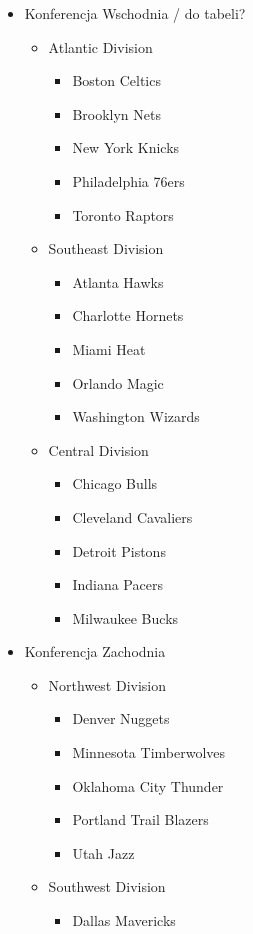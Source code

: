 \documentclass[inzynierska]{pwr_wmat_praca_dyplomowa}
\theoremstyle{plain}
\numberwithin{theorem}{chapter}
\theoremstyle{definition}
\numberwithin{theorem}{chapter}
\begin{document}
\begin{itemize}
	\item Konferencja Wschodnia   / do tabeli?
	\begin{itemize}
		\item Atlantic Division
		\begin{itemize}
			\item Boston Celtics
			\item Brooklyn Nets
			\item New York Knicks
			\item Philadelphia 76ers
			\item Toronto Raptors
		\end{itemize}
		\item Southeast Division
		\begin{itemize}
			\item Atlanta Hawks
			\item Charlotte Hornets
			\item Miami Heat
			\item Orlando Magic
			\item Washington Wizards
		\end{itemize}
		\item Central Division
		\begin{itemize}
			\item Chicago Bulls
			\item Cleveland Cavaliers
			\item Detroit Pistons
			\item Indiana Pacers
			\item Milwaukee Bucks
		\end{itemize}
	\end{itemize}	
	\item Konferencja Zachodnia
	\begin{itemize}
		\item Northwest Division
		\begin{itemize}
			\item Denver Nuggets
			\item Minnesota Timberwolves
			\item Oklahoma City Thunder
			\item Portland Trail Blazers
			\item Utah Jazz
		\end{itemize}
		\item Southwest Division
		\begin{itemize}
			\item Dallas Mavericks

\end{itemize}
\end{itemize}
\end{itemize}
\end{document}
